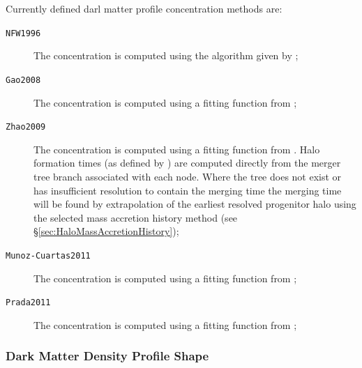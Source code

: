 Currently defined darl matter profile concentration methods are:
\begin{description}
 \item [{\tt NFW1996}] The concentration is computed using the algorithm given by \cite{navarro_structure_1996};
 \item [{\tt Gao2008}] The concentration is computed using a fitting function from \cite{gao_redshift_2008};
 \item [{\tt Zhao2009}] The concentration is computed using a fitting function from \cite{zhao_accurate_2009}. Halo formation times (as defined by \citealt{zhao_accurate_2009}) are computed directly from the merger tree branch associated with each node. Where the tree does not exist or has insufficient resolution to contain the merging time the merging time will be found by extrapolation of the earliest resolved progenitor halo using the selected mass accretion history method (see \S\ref{sec:HaloMassAccretionHistory});
 \item [{\tt Munoz-Cuartas2011}] The concentration is computed using a fitting function from \cite{munoz-cuartas_redshift_2011};
 \item [{\tt Prada2011}] The concentration is computed using a fitting function from \cite{prada_halo_2011};
\end{description}

\subsubsection{Dark Matter Density Profile Shape}\label{sec:darkMatterProfileShape}

